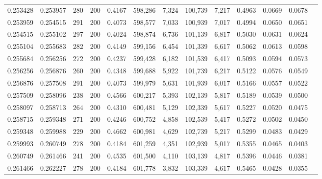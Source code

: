 \begin{tabular}{rrrrrrrrrrrrr}
0.253428 & 0.253957 &    280 & 200 &                                     0.4167 & 598,286 &   7,324 & 100,739 &   7,217 & 0.4963 & 0.0669 & 0.0678 \\
0.253959 & 0.254515 &    291 & 200 &                                     0.4073 & 598,577 &   7,033 & 100,939 &   7,017 & 0.4994 & 0.0650 & 0.0651 \\
0.254515 & 0.255102 &    297 & 200 &                                     0.4024 & 598,874 &   6,736 & 101,139 &   6,817 & 0.5030 & 0.0631 & 0.0624 \\
0.255104 & 0.255683 &    282 & 200 &                                     0.4149 & 599,156 &   6,454 & 101,339 &   6,617 & 0.5062 & 0.0613 & 0.0598 \\
0.255684 & 0.256256 &    272 & 200 &                                     0.4237 & 599,428 &   6,182 & 101,539 &   6,417 & 0.5093 & 0.0594 & 0.0573 \\
0.256256 & 0.256876 &    260 & 200 &                                     0.4348 & 599,688 &   5,922 & 101,739 &   6,217 & 0.5122 & 0.0576 & 0.0549 \\
0.256876 & 0.257508 &    291 & 200 &                                     0.4073 & 599,979 &   5,631 & 101,939 &   6,017 & 0.5166 & 0.0557 & 0.0522 \\
0.257509 & 0.258096 &    238 & 200 &                                     0.4566 & 600,217 &   5,393 & 102,139 &   5,817 & 0.5189 & 0.0539 & 0.0500 \\
0.258097 & 0.258713 &    264 & 200 &                                     0.4310 & 600,481 &   5,129 & 102,339 &   5,617 & 0.5227 & 0.0520 & 0.0475 \\
0.258715 & 0.259348 &    271 & 200 &                                     0.4246 & 600,752 &   4,858 & 102,539 &   5,417 & 0.5272 & 0.0502 & 0.0450 \\
0.259348 & 0.259988 &    229 & 200 &                                     0.4662 & 600,981 &   4,629 & 102,739 &   5,217 & 0.5299 & 0.0483 & 0.0429 \\
0.259993 & 0.260749 &    278 & 200 &                                     0.4184 & 601,259 &   4,351 & 102,939 &   5,017 & 0.5355 & 0.0465 & 0.0403 \\
0.260749 & 0.261466 &    241 & 200 &                                     0.4535 & 601,500 &   4,110 & 103,139 &   4,817 & 0.5396 & 0.0446 & 0.0381 \\
0.261466 & 0.262227 &    278 & 200 &                                     0.4184 & 601,778 &   3,832 & 103,339 &   4,617 & 0.5465 & 0.0428 & 0.0355 \\

\end{tabular}
